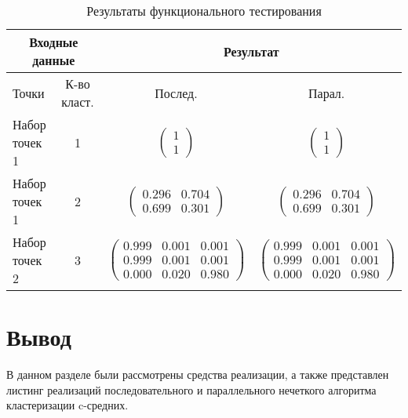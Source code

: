 \begin{table}[H]
	\caption{Результаты функционального тестирования}
	\label{tbl:func-tests}
	\begin{tabularx}{\textwidth}{|X|c|c|c|}
		\hline 
		\multicolumn{2}{|c|}{Входные данные} & \multicolumn{2}{c|}{Результат} \\
		\hline
		Точки & К-во класт.  & Послед. & Парал. \\
		\hline
		Набор точек 1 & 1 
		& $ \begin{pmatrix}
			1 \\
			1
		\end{pmatrix} $
		& $ \begin{pmatrix}
			1 \\
			1
		\end{pmatrix} $
		\\ \hline
		Набор точек 1 & 2 
		& $ \begin{pmatrix}
			0.296 & 0.704 \\
			0.699 & 0.301 
		\end{pmatrix} $
		& $ \begin{pmatrix}
			0.296 & 0.704 \\
			0.699 & 0.301 
		\end{pmatrix} $ 
		\\ \hline
		Набор точек 2 & 3 
		& $ \begin{pmatrix}
			0.999 & 0.001 & 0.001 \\
			0.999 & 0.001 & 0.001 \\
			0.000 & 0.020 & 0.980
		\end{pmatrix} $
		& $ \begin{pmatrix}
			0.999 & 0.001 & 0.001 \\
			0.999 & 0.001 & 0.001 \\
			0.000 & 0.020 & 0.980
		\end{pmatrix} $
		\\ \hline
	\end{tabularx}
\end{table}

\section*{Вывод}

В данном разделе были рассмотрены средства реализации, а также представлен листинг реализаций последовательного и параллельного нечеткого алгоритма кластеризации c-средних.